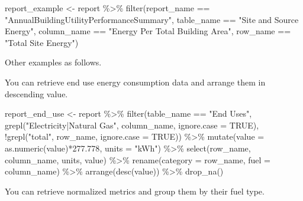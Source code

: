 \documentclass[
]{book}
\newenvironment{Shaded}{\begin{snugshade}}{\end{snugshade}}
\newcommand{\AttributeTok}[1]{\textcolor[rgb]{0.77,0.63,0.00}{#1}}
\newcommand{\ConstantTok}[1]{\textcolor[rgb]{0.00,0.00,0.00}{#1}}
\newcommand{\FloatTok}[1]{\textcolor[rgb]{0.00,0.00,0.81}{#1}}
\newcommand{\FunctionTok}[1]{\textcolor[rgb]{0.00,0.00,0.00}{#1}}
\newcommand{\NormalTok}[1]{#1}
\newcommand{\OtherTok}[1]{\textcolor[rgb]{0.56,0.35,0.01}{#1}}
\newcommand{\SpecialCharTok}[1]{\textcolor[rgb]{0.00,0.00,0.00}{#1}}
\newcommand{\StringTok}[1]{\textcolor[rgb]{0.31,0.60,0.02}{#1}}
\begin{document}
\begin{Shaded}
\begin{Highlighting}[]
\NormalTok{report\_example }\OtherTok{\textless{}{-}}\NormalTok{ report }\SpecialCharTok{\%\textgreater{}\%}
    \FunctionTok{filter}\NormalTok{(report\_name }\SpecialCharTok{==} \StringTok{"AnnualBuildingUtilityPerformanceSummary"}\NormalTok{, }
\NormalTok{           table\_name }\SpecialCharTok{==} \StringTok{"Site and Source Energy"}\NormalTok{,}
\NormalTok{           column\_name }\SpecialCharTok{==} \StringTok{"Energy Per Total Building Area"}\NormalTok{,}
\NormalTok{           row\_name }\SpecialCharTok{==} \StringTok{"Total Site Energy"}\NormalTok{)}
\end{Highlighting}
\end{Shaded}

Other examples as follows.

You can retrieve end use energy consumption data and arrange them in descending value.

\begin{Shaded}
\begin{Highlighting}[]
\NormalTok{report\_end\_use }\OtherTok{\textless{}{-}}\NormalTok{ report }\SpecialCharTok{\%\textgreater{}\%}
    \FunctionTok{filter}\NormalTok{(table\_name }\SpecialCharTok{==} \StringTok{"End Uses"}\NormalTok{, }
           \FunctionTok{grepl}\NormalTok{(}\StringTok{"Electricity|Natural Gas"}\NormalTok{, column\_name, }\AttributeTok{ignore.case =} \ConstantTok{TRUE}\NormalTok{),}
           \SpecialCharTok{!}\FunctionTok{grepl}\NormalTok{(}\StringTok{"total"}\NormalTok{, row\_name, }\AttributeTok{ignore.case =} \ConstantTok{TRUE}\NormalTok{)) }\SpecialCharTok{\%\textgreater{}\%}
    \FunctionTok{mutate}\NormalTok{(}\AttributeTok{value =} \FunctionTok{as.numeric}\NormalTok{(value)}\SpecialCharTok{*}\FloatTok{277.778}\NormalTok{,}
           \AttributeTok{units =} \StringTok{"kWh"}\NormalTok{) }\SpecialCharTok{\%\textgreater{}\%}
    \FunctionTok{select}\NormalTok{(row\_name, column\_name, units, value) }\SpecialCharTok{\%\textgreater{}\%}
    \FunctionTok{rename}\NormalTok{(}\AttributeTok{category =}\NormalTok{ row\_name, }\AttributeTok{fuel =}\NormalTok{ column\_name) }\SpecialCharTok{\%\textgreater{}\%}
    \FunctionTok{arrange}\NormalTok{(}\FunctionTok{desc}\NormalTok{(value)) }\SpecialCharTok{\%\textgreater{}\%}
    \FunctionTok{drop\_na}\NormalTok{()}
\end{Highlighting}
\end{Shaded}

You can retrieve normalized metrics and group them by their fuel type.
\end{document}
